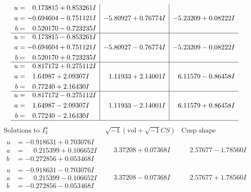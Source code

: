 \documentclass[1p]{elsarticle_modified}
\theoremstyle{definition}
\newcommand{\I}{\sqrt{-1}}
\begin{document}
$$\begin{array}{c|c|c}
\begin{aligned}
u &= \phantom{-}0.173815 + 0.853261 I \\
a &= -0.694604 - 0.751121 I \\
b &= \phantom{-}0.520170 - 0.723235 I\end{aligned}
 & -5.80927 + 0.76774 I & -5.23209 + 0.08222 I \\ \hline\begin{aligned}
u &= \phantom{-}0.173815 - 0.853261 I \\
a &= -0.694604 + 0.751121 I \\
b &= \phantom{-}0.520170 + 0.723235 I\end{aligned}
 & -5.80927 - 0.76774 I & -5.23209 - 0.08222 I \\ \hline\begin{aligned}
u &= \phantom{-}0.817172 + 0.275112 I \\
a &= \phantom{-}1.64987 + 2.09307 I \\
b &= \phantom{-}0.77240 + 2.16430 I\end{aligned}
 & \phantom{-}1.11933 + 2.14001 I & \phantom{-}6.11579 - 0.86458 I \\ \hline\begin{aligned}
u &= \phantom{-}0.817172 - 0.275112 I \\
a &= \phantom{-}1.64987 - 2.09307 I \\
b &= \phantom{-}0.77240 - 2.16430 I\end{aligned}
 & \phantom{-}1.11933 - 2.14001 I & \phantom{-}6.11579 + 0.86458 I\\
 \hline 
 \end{array}$$\newpage$$\begin{array}{c|c|c}  
\text{Solutions to }I^u_{3}& \I (\text{vol} + \sqrt{-1}CS) & \text{Cusp shape}\\
 \hline 
\begin{aligned}
u &= -0.918631 + 0.703076 I \\
a &= \phantom{-}0.215399 + 0.106652 I \\
b &= -0.272856 + 0.053468 I\end{aligned}
 & \phantom{-}3.37208 + 0.07368 I & \phantom{-}2.57677 - 1.78560 I \\ \hline\begin{aligned}
u &= -0.918631 - 0.703076 I \\
a &= \phantom{-}0.215399 - 0.106652 I \\
b &= -0.272856 - 0.053468 I\end{aligned}
 & \phantom{-}3.37208 - 0.07368 I & \phantom{-}2.57677 + 1.78560 I \\ \hline\begin{aligned}

\end{aligned}
\end{array}$$
\end{document}

